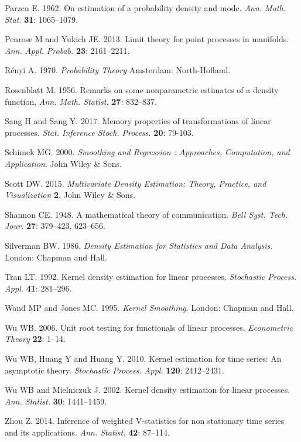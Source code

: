 \documentclass[11pt]{article}
\begin{document}
\begin{thebibliography}{99}
Parzen E. 1962. On estimation of a probability density and mode. {\it Ann. Math. Stat.} \textbf{31}: 1065--1079.

Penrose M and Yukich JE. 2013.  Limit theory for point processes in manifolds. {\it Ann. Appl. Probab.} \textbf{23}: 2161--2211.

R\'{e}nyi A. 1970.  {\it Probability Theory}  Amsterdam: North-Holland.

Rosenblatt M. 1956. Remarks on some nonparametric estimates of a density function, {\it Ann. Math. Statist.} \textbf{27}: 832--837.


Sang H and Sang Y. 2017.  Memory properties of transformations of linear processes. {\it Stat. Inference Stoch. Process.}  {\bf 20}: 79-103.

Schimek MG. 2000. {\it Smoothing and Regression : Approaches, Computation, and Application}. John Wiley \& Sons. 

Scott DW. 2015.  {\it Multivariate Density Estimation: Theory, Practice, and Visualization} {\textbf 2}. John Wiley \& Sons.

Shannon CE. 1948.  A mathematical theory of communication. {\it Bell Syst. Tech. Jour.} \textbf{27}: 379--423, 623--656.

Silverman BW. 1986.  {\it Density Estimation for Statistics and Data Analysis}. London: Chapman and
Hall.

Tran LT.  1992. Kernel density estimation for linear processes. {\it Stochastic Process. Appl.} \textbf{41}:  281--296. 

Wand MP and Jones MC. 1995.  {\it Kernel Smoothing}. London: Chapman and Hall.

Wu WB.  2006.  Unit root testing for functionals of linear processes. {\it Econometric Theory} \textbf{22}: 1--14.

Wu WB, Huang Y and Huang Y. 2010.  Kernel estimation for time series: An asymptotic theory. {\it Stochastic Process. Appl.}  \textbf{120}:  2412--2431. 

Wu WB and Mielniczuk J. 2002.  Kernel density estimation for linear processes. {\it Ann. Statist.} \textbf{30}:  1441--1459. 


Zhou Z. 2014.  Inference of weighted V-statistics for non stationary time series and its applications.  {\it Ann. Statist.} \textbf{42}:  87--114. 

\end{thebibliography}
\end{document}
